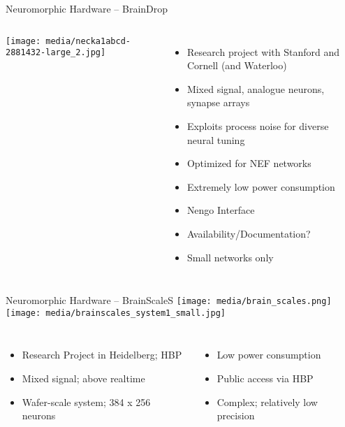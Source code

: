 \documentclass[handout,aspectratio=169]{beamer}
\begin{document}
\begin{frame}{Neuromorphic Hardware -- BrainDrop}
	\centering
	\begin{columns}
		\texttt{[image: media/necka1abcd-2881432-large\_2.jpg]}\\[0.5cm]
		\begin{itemize}
			\setlength{\itemsep}{0.25cm}
			\item Research project with Stanford and Cornell (and Waterloo)
			\item Mixed signal, analogue neurons, synapse arrays
			\item Exploits process noise for diverse neural tuning
			\item Optimized for NEF networks
			\item<2->[\OPlus] Extremely low power consumption
			\item<2->[\OPlus] Nengo Interface
			\item<2->[\OMeh] Availability/Documentation?
			\item<2->[\OMinus] Small networks only
		\end{itemize}
	\end{columns}
\end{frame}

\begin{frame}{Neuromorphic Hardware -- BrainScaleS}
	\vspace{0.45cm}
	\centering
	\texttt{[image: media/brain\_scales.png]}\hspace{0.5cm}%
	\texttt{[image: media/brainscales\_system1\_small.jpg]}\\[0.5cm]
	\begin{columns}
		\column{0.5\textwidth}
		\begin{itemize}
			\setlength{\itemsep}{0.25cm}
			\item Research Project in Heidelberg; HBP
			\item Mixed signal; above realtime
			\item Wafer-scale system; 384 x 256 neurons
		\end{itemize}
		\column{0.5\textwidth}
		\begin{itemize}
			\setlength{\itemsep}{0.25cm}
			\item<2->[\OPlus] Low power consumption
			\item<2->[\OPlus] Public access via HBP
			\item<2->[\OMinus] Complex; relatively low precision
		\end{itemize}
	\end{columns}
	\vspace{1cm}
\end{frame}
\end{document}
